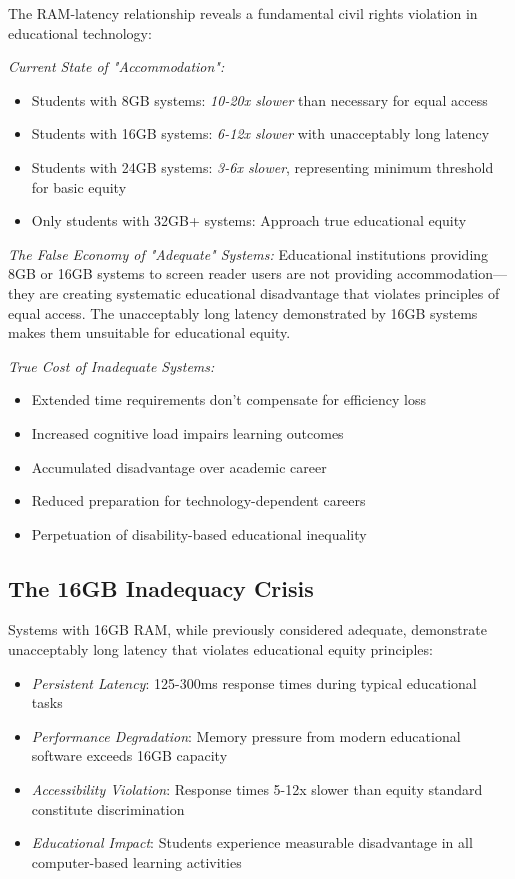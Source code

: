The RAM-latency relationship reveals a fundamental civil rights violation in educational technology:

\emph{Current State of "Accommodation":}

\begin{itemize}
\item Students with 8GB systems: \emph{10-20x slower} than necessary for equal access
\item Students with 16GB systems: \emph{6-12x slower} with unacceptably long latency
\item Students with 24GB systems: \emph{3-6x slower}, representing minimum threshold for basic equity
\item Only students with 32GB+ systems: Approach true educational equity
\end{itemize}

\emph{The False Economy of "Adequate" Systems:}
Educational institutions providing 8GB or 16GB systems to screen reader users are not providing accommodation—they are creating systematic educational disadvantage that violates principles of equal access. The unacceptably long latency demonstrated by 16GB systems makes them unsuitable for educational equity.

\emph{True Cost of Inadequate Systems:}

\begin{itemize}
\item Extended time requirements don't compensate for efficiency loss
\item Increased cognitive load impairs learning outcomes
\item Accumulated disadvantage over academic career
\item Reduced preparation for technology-dependent careers
\item Perpetuation of disability-based educational inequality
\end{itemize}

\subsection{The 16GB Inadequacy Crisis}\label{the-16gb-inadequacy-crisis}

Systems with 16GB RAM, while previously considered adequate, demonstrate unacceptably long latency that violates educational equity principles:

\begin{itemize}
\item \emph{Persistent Latency}: 125-300ms response times during typical educational tasks
\item \emph{Performance Degradation}: Memory pressure from modern educational software exceeds 16GB capacity
\item \emph{Accessibility Violation}: Response times 5-12x slower than equity standard constitute discrimination
\item \emph{Educational Impact}: Students experience measurable disadvantage in all computer-based learning activities
\end{itemize}

